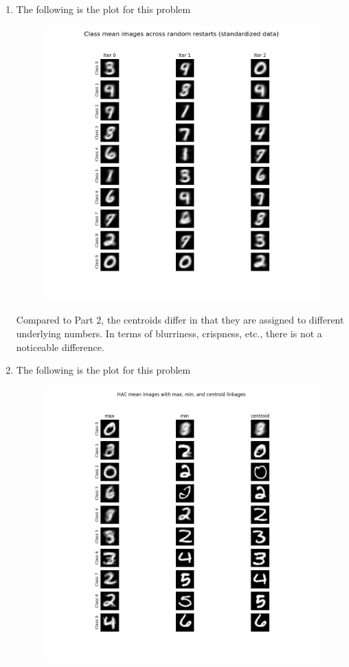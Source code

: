 \documentclass[submit]{harvardml}
\begin{document}
\begin{enumerate}
\newpage
\item The following is the plot for this problem 
\begin{figure}[h]
\includegraphics[width=\linewidth]{part3plot}
\end{figure}

Compared to Part 2, the centroids differ in that they are assigned to different 
underlying numbers. In terms of blurriness, crispness, etc., there is not a 
noticeable difference.

\newpage
\item The following is the plot for this problem 
\begin{figure}[h]
\includegraphics[width=\linewidth]{part4plot}
\end{figure}


\end{enumerate}
\end{document}
